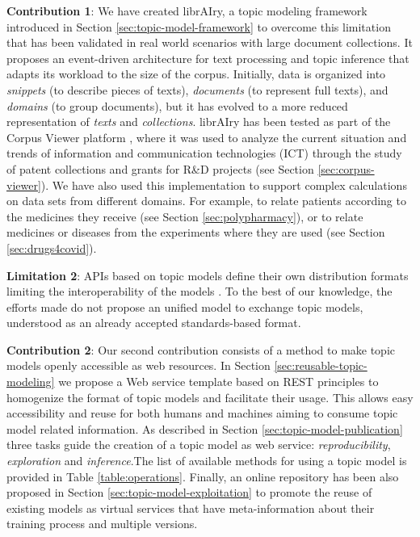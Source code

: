 \textbf{Contribution 1}: We have created librAIry, a topic modeling framework introduced in Section \ref{sec:topic-model-framework} to overcome this limitation that has been validated in real world scenarios with large document collections. It proposes an event-driven architecture for text processing and topic inference that adapts its workload to the size of the corpus. Initially, data is organized into \textit{snippets} (to describe pieces of texts), \textit{documents} (to represent full texts), and \textit{domains} (to group documents), but it has evolved to a more reduced representation of \textit{texts} and \textit{collections}. librAIry has been tested as part of the Corpus Viewer platform \citep{Samy2019}, where it was used to analyze the current situation and trends of information and communication technologies (ICT) through the study of patent collections and grants for R\&D projects (see Section \ref{sec:corpus-viewer}). We have also used this implementation to support complex calculations on data sets from different domains. For example, to relate patients according to the medicines they receive \citep{Badenes-Olmedo2019c} (see Section 	\ref{sec:polypharmacy}), or to relate medicines or diseases from the experiments where they are used (see Section \ref{sec:drugs4covid}). 


\textbf{Limitation 2}: APIs based on topic models define their own distribution formats limiting the interoperability of the models \citep{Lisena:NLPOSS2020}. To the best of our knowledge, the efforts made do not propose an unified model to exchange topic models, understood as an already accepted standards-based format.

\textbf{Contribution 2}: Our second contribution consists of a method to make topic models openly accessible as web resources. In Section \ref{sec:reusable-topic-modeling} we propose a Web service template based on REST principles to homogenize the format of topic models and facilitate their usage. This allows easy accessibility and reuse for both humans and machines aiming to consume topic model related information. As described in Section \ref{sec:topic-model-publication} three tasks guide the creation of a topic model as web service: \textit{reproducibility}, \textit{exploration} and \textit{inference}.The list of available methods for using a topic model is provided in Table \ref{table:operations}. Finally, an online repository has been also proposed in Section \ref{sec:topic-model-exploitation} to promote the reuse of existing models as virtual services that have meta-information about their training process and multiple versions. 

